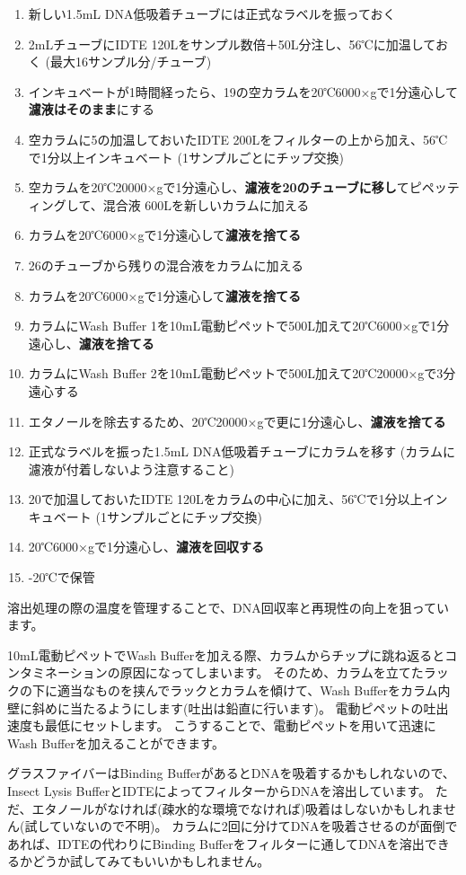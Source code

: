 \documentclass[titlepage,10pt,a4paper,uplatex]{jsbook}
\renewcommand{\textbf}[1]{{\bfseries\sffamily#1}}
\begin{document}
\begin{enumerate}
\item 新しい1.5mL DNA低吸着チューブには正式なラベルを振っておく
\item 2mLチューブにIDTE 120{\textmu}Lをサンプル数倍＋50{\textmu}L分注し、56℃に加温しておく (最大16サンプル分/チューブ)
\item インキュベートが1時間経ったら、19の空カラムを20℃6000×gで1分遠心して\textbf{濾液はそのまま}にする
\item 空カラムに5の加温しておいたIDTE 200{\textmu}Lをフィルターの上から加え、56℃で1分以上インキュベート (1サンプルごとにチップ交換)
\item 空カラムを20℃20000×gで1分遠心し、\textbf{濾液を20のチューブに移し}てピペッティングして、混合液 600{\textmu}Lを新しいカラムに加える
\item カラムを20℃6000×gで1分遠心して\textbf{濾液を捨てる}
\item 26のチューブから残りの混合液をカラムに加える
\item カラムを20℃6000×gで1分遠心して\textbf{濾液を捨てる}
\item カラムにWash Buffer 1を10mL電動ピペットで500{\textmu}L加えて20℃6000×gで1分遠心し、\textbf{濾液を捨てる}
\item カラムにWash Buffer 2を10mL電動ピペットで500{\textmu}L加えて20℃20000×gで3分遠心する
\item エタノールを除去するため、20℃20000×gで更に1分遠心し、\textbf{濾液を捨てる}
\item 正式なラベルを振った1.5mL DNA低吸着チューブにカラムを移す (カラムに濾液が付着しないよう注意すること)
\item 20で加温しておいたIDTE 120{\textmu}Lをカラムの中心に加え、56℃で1分以上インキュベート (1サンプルごとにチップ交換)
\item 20℃6000×gで1分遠心し、\textbf{濾液を回収する}
\item -20℃で保管
\end{enumerate}

溶出処理の際の温度を管理することで、DNA回収率と再現性の向上を狙っています。

10mL電動ピペットでWash Bufferを加える際、カラムからチップに跳ね返るとコンタミネーションの原因になってしまいます。
そのため、カラムを立てたラックの下に適当なものを挟んでラックとカラムを傾けて、Wash Bufferをカラム内壁に斜めに当たるようにします(吐出は鉛直に行います)。
電動ピペットの吐出速度も最低にセットします。
こうすることで、電動ピペットを用いて迅速にWash Bufferを加えることができます。

グラスファイバーはBinding BufferがあるとDNAを吸着するかもしれないので、Insect Lysis BufferとIDTEによってフィルターからDNAを溶出しています。
ただ、エタノールがなければ(疎水的な環境でなければ)吸着はしないかもしれません(試していないので不明)。
カラムに2回に分けてDNAを吸着させるのが面倒であれば、IDTEの代わりにBinding Bufferをフィルターに通してDNAを溶出できるかどうか試してみてもいいかもしれません。
\end{document}

